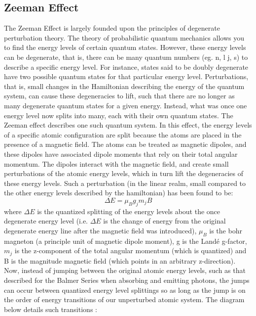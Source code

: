 \documentclass{article}
\begin{document}
        \subsection{Zeeman Effect}
        The Zeeman Effect is largely founded upon the principles of degenerate perturbation theory. The theory of probabilistic quantum mechanics allows you to find the energy levels of certain quantum states. However, these energy levels can be degenerate, that is, there can be many quantum numbers (eg. n, l j, s) to describe a specific energy level. For instance, states said to be doubly degenerate have two possible quantum states for that particular energy level. Perturbations, that is, small changes in the Hamiltonian describing the energy of the quantum system, can cause these degeneracies to lift, such that there are no longer as many degenerate quantum states for a given energy. Instead, what was once one energy level now splits into many, each with their own quantum states. The Zeeman effect describes one such quantum system. In this effect, the energy levels of a specific atomic configuration are split because the atoms are placed in the presence of a magnetic field. The atoms can be treated as magnetic dipoles, and these dipoles have associated dipole moments that rely on their total angular momentum. The dipoles interact with the magnetic field, and create small perturbations of the atomic energy levels, which in turn lift the degeneracies of these energy levels. Such a perturbation (in the linear realm, small compared to the other energy levels described by the hamiltonian) has been found to be:
        \begin{equation}
            \Delta E = \mu_B g_j m_j B
        \end{equation}
        where $\Delta E$ is the quantized splitting of the energy levels about the once degenerate energy level (i.e. $\Delta E$ is the change of energy from the original degenerate energy line after the magnetic field was introduced), $\mu_B$ is the bohr magneton (a principle unit of magnetic dipole moment), g is the Landé g-factor, $m_j$ is the z-component of the total angular momentum (which is quantized) and B is the magnitude magnetic field (which points in an arbitrary z-direction).\cite{purd}\\\indent
        Now, instead of jumping between the original atomic energy levels, such as that described for the Balmer Series when absorbing and emitting photons, the jumps can occur between  quantized energy level splittings so as long as the jump is on the order of energy transitions of our unperturbed atomic system. The diagram below details such transitions \cite{atm}:
\end{document}
